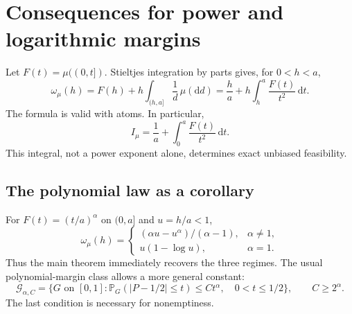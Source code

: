 \documentclass[11pt,a4paper]{article}
\theoremstyle{definition}
\newcommand{\Prob}{\mathbb P}
\newcommand{\cG}{\mathcal G}
\newcommand{\om}{\omega_\mu}
\newcommand{\Iinv}{I_\mu}
\begin{document}
\section{Consequences for power and logarithmic margins}\label{sec:rates}
Let $F(t)=\mu((0,t])$. Stieltjes integration by parts gives, for $0<h<a$,
\begin{equation}\label{eq:cdf-formula}
 \om(h)=F(h)+h\int_{(h,a]}\frac1d\,\mu(\mathrm d d)
       =\frac ha+h\int_h^a\frac{F(t)}{t^2}\,\mathrm dt.
\end{equation}
The formula is valid with atoms. In particular,
\begin{equation}\label{eq:cdf-integrability}
 \Iinv=\frac1a+\int_0^a\frac{F(t)}{t^2}\,\mathrm dt.
\end{equation}
This integral, not a power exponent alone, determines exact unbiased
feasibility.

\subsection{The polynomial law as a corollary}
For $F(t)=(t/a)^\alpha$ on $(0,a]$ and $u=h/a<1$,
\begin{equation}\label{eq:power-modulus}
 \om(h)=
 \begin{cases}
  (\alpha u-u^\alpha)/(\alpha-1),&\alpha\ne1,\\
  u(1-\log u),&\alpha=1.
 \end{cases}
\end{equation}
Thus the main theorem immediately recovers the three regimes.
The usual polynomial-margin class allows a more general constant:
\begin{equation}\label{eq:power-class}
 \cG_{\alpha,C}=\{G\text{ on }[0,1]:
  \Prob_G(|P-1/2|\le t)\le Ct^\alpha,\quad0<t\le1/2\},
 \qquad C\ge2^\alpha.
\end{equation}
The last condition is necessary for nonemptiness.
\end{document}
